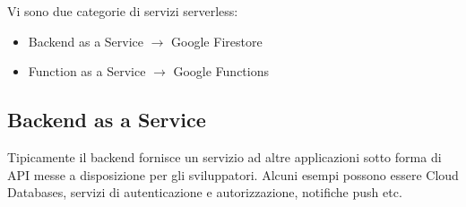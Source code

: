 \documentclass{article}
\begin{document}
		Vi sono due categorie di servizi serverless:
		\begin{itemize}
		\item Backend as a Service $\rightarrow$ Google Firestore
		\item Function as a Service $\rightarrow$ Google Functions
		\end{itemize}
		
		\subsection{Backend as a Service}
		Tipicamente il backend fornisce un servizio ad altre applicazioni sotto forma di API messe a disposizione per gli sviluppatori. Alcuni esempi possono essere Cloud Databases, servizi di autenticazione e autorizzazione, notifiche push etc.
		
\end{document}
